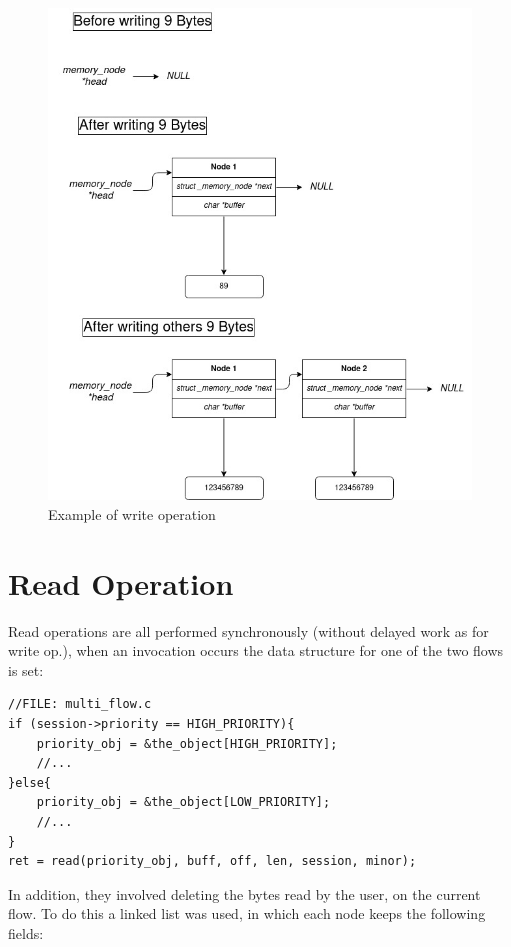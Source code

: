 \documentclass[12pt]{report}
\begin{document}
\begin{figure}[h]
	\centering
	\includegraphics[scale = .45]{write.jpg}
	\caption{Example of write operation}
	\label{fig:write}
\end{figure}




\section{Read Operation}
\label{chap:read operation}

Read operations are all performed synchronously (without delayed work as for write op.), when an invocation occurs the data structure for one of the two flows is set:

\begin{lstlisting}
//FILE: multi_flow.c
if (session->priority == HIGH_PRIORITY){
	priority_obj = &the_object[HIGH_PRIORITY];	
	//...
}else{
	priority_obj = &the_object[LOW_PRIORITY];
	//...
}
ret = read(priority_obj, buff, off, len, session, minor);
\end{lstlisting}

In addition, they involved deleting the bytes read by the user, on the current flow. To do this a linked list was used, in which each node keeps the following fields:
\end{document}
